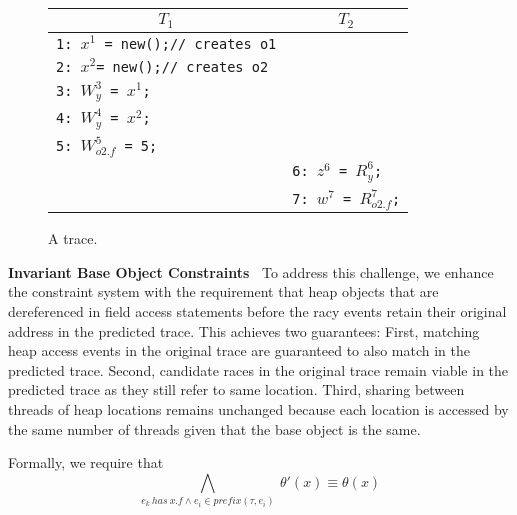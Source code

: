 \begin{figure}
	\centering
	\begin{tabular}{ll}
		\hline
		\multicolumn{1}{c}{$T_1$} & \multicolumn{1}{c}{$T_2$} \\
		\hline
		{\tt 1: $x^1$ = new();// creates o1} & \\
		{\tt 2: $x^2$= new();// creates o2} & \\
		{\tt 3: $W^3_{y}$ = $x^1$;} & \\
		{\tt 4: $W^4_{y}$ = $x^2$;} & \\
		{\tt 5: $W^5_{o2.f}$ = 5;} & \\	
		& {\tt 6: $z^6$ = $R^6_{y}$;} \\
		& {\tt 7: $w^7$ = $R^7_{o2.f}$;} \\
	\end{tabular}
	\caption{\label{fig:heapAccess} A trace.}
\end{figure}

{\bf Invariant Base Object Constraints\ } To address this challenge, we enhance the constraint system with the requirement that heap objects that are dereferenced in field access statements before the racy events retain their original address in the predicted trace.
This achieves two guarantees: First, matching heap access events in the original trace are guaranteed to also match in the predicted trace. Second, candidate races in the original trace remain viable in the predicted trace as they still refer to same location. Third, sharing between threads of heap locations remains unchanged  because
each location is accessed by the same number of threads given that the base object is the same. 







Formally, we require that
$$
\bigwedge_{ e_k \ has\  x.f \wedge e_i \in prefix(\tau,e_i) }\
	\theta'(x) \equiv  \theta(x)
$$


